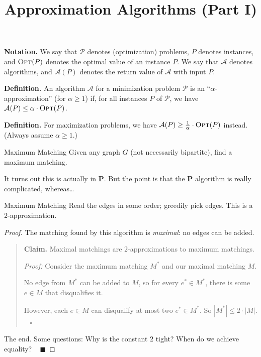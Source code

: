 \title{Approximation Algorithms (Part I)}



\textbf{Notation.} We say that $\mathcal{P}$ denotes (optimization) problems, $P$ denotes instances, and $\textsc{Opt}(P)$ denotes the optimal value of an instance $P$.  We say that $\mathcal{A}$ denotes algorithms, and $\mathcal{A}(P)$ denotes the return value of $\mathcal{A}$ with input $P$.

\textbf{Definition.} An algorithm $\mathcal{A}$ for a minimization problem $\mathcal{P}$ is an ``$\alpha$-approximation'' (for $\alpha \geq 1$) if, for all instances $P$ of $\mathcal{P}$, we have $\mathcal{A}(P) \leq \alpha \cdot \textsc{Opt}(P)$.

\textbf{Definition.} For maximization problems, we have $\mathcal{A}(P) \geq \frac{1}{\alpha} \cdot \textsc{Opt}(P)$ instead.  (Always assume $\alpha \geq 1$.)

\begin{problem}{Maximum Matching}
    Given any graph $G$ (not necessarily bipartite), find a maximum matching.
\end{problem}

\begin{remark}
    It turns out this is actually in $\textbf{P}$.  But the point is that the $\textbf{P}$ algorithm is really complicated, whereas\dots
\end{remark}

\begin{solution}{Maximum Matching}
    Read the edges in some order; greedily pick edges.  This is a $2$-approximation.
\end{solution}

\begin{proof}
    The matching found by this algorithm is \emph{maximal}: no edges can be added.
    \begin{quote}
        \textbf{Claim.} Maximal matchings are $2$-approximations to maximum matchings.

        \emph{Proof:} Consider the maximum matching $M^*$ and our maximal matching $M$.

        No edge from $M^*$ can be added to $M$, so for every $e^* \in M^*$, there is some $e \in M$ that disqualifies it.

        However, each $e \in M$ can disqualify at most two $e^* \in M^*$.  So $|M^*| \leq 2 \cdot |M|$. ~ $\square$
    \end{quote}
    The end.  Some questions: Why is the constant $2$ tight?  When do we achieve equality? ~ $\blacksquare$
\end{proof}

